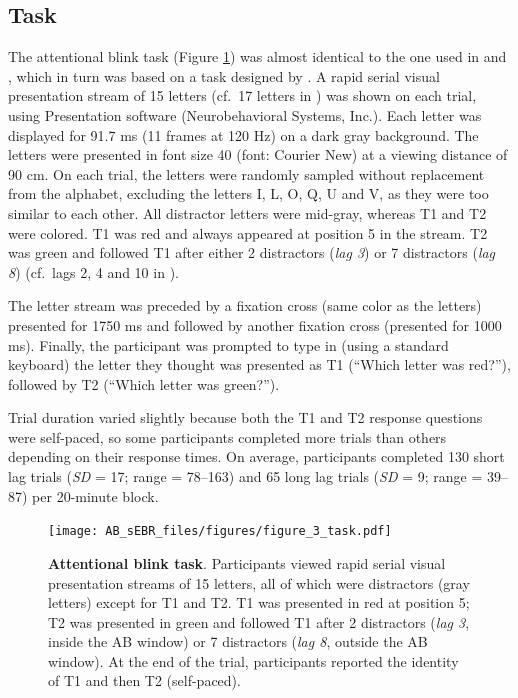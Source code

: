 \documentclass[11pt,]{memoir}
\begin{document}
\hypertarget{AB_sEBR-task}{%
\subsection{Task}\label{AB_sEBR-task}}

The attentional blink task (Figure \ref{fig:AB-sEBR-fig-task}) was almost identical to the one used in \textcite{London2015} and \textcite{Slagter2013}, which in turn was based on a task designed by \textcite{Dux2008}. A rapid serial visual presentation stream of 15 letters (cf.~17 letters in \textcite{London2015}) was shown on each trial, using Presentation software (Neurobehavioral Systems, Inc.). Each letter was displayed for 91.7 ms (11 frames at 120 Hz) on a dark gray background. The letters were presented in font size 40 (font: Courier New) at a viewing distance of 90 cm. On each trial, the letters were randomly sampled without replacement from the alphabet, excluding the letters I, L, O, Q, U and V, as they were too similar to each other. All distractor letters were mid-gray, whereas T1 and T2 were colored. T1 was red and always appeared at position 5 in the stream. T2 was green and followed T1 after either 2 distractors (\emph{lag 3}) or 7 distractors (\emph{lag 8}) (cf.~lags 2, 4 and 10 in \textcite{London2015}).

The letter stream was preceded by a fixation cross (same color as the letters) presented for 1750 ms and followed by another fixation cross (presented for 1000 ms). Finally, the participant was prompted to type in (using a standard keyboard) the letter they thought was presented as T1 (``Which letter was red?''), followed by T2 (``Which letter was green?'').

Trial duration varied slightly because both the T1 and T2 response questions were self-paced, so some participants completed more trials than others depending on their response times. On average, participants completed 130 short lag trials (\emph{SD} = 17; range = 78--163) and 65 long lag trials (\emph{SD} = 9; range = 39--87) per 20-minute block.

\begin{figure}
\centering
\texttt{[image: AB\_sEBR\_files/figures/figure\_3\_task.pdf]}
\caption{\label{fig:AB-sEBR-fig-task}\textbf{Attentional blink task}. Participants viewed rapid serial visual presentation streams of 15 letters, all of which were distractors (gray letters) except for T1 and T2. T1 was presented in red at position 5; T2 was presented in green and followed T1 after 2 distractors (\emph{lag 3}, inside the AB window) or 7 distractors (\emph{lag 8}, outside the AB window). At the end of the trial, participants reported the identity of T1 and then T2 (self-paced).}
\end{figure}
\end{document}
